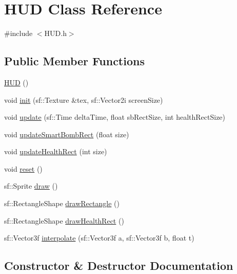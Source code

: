 \hypertarget{class_h_u_d}{}\section{H\+UD Class Reference}
\label{class_h_u_d}


{\ttfamily \#include $<$H\+U\+D.\+h$>$}

\subsection*{Public Member Functions}
\begin{DoxyCompactItemize}
\item 
\hyperlink{class_h_u_d_a568b8ee1591f9ba3ed36ae05966f6b56}{H\+UD} ()
\item 
void \hyperlink{class_h_u_d_abcd24489d983e367e38f1ee35e4f0cef}{init} (sf\+::\+Texture \&tex, sf\+::\+Vector2i screen\+Size)
\item 
void \hyperlink{class_h_u_d_a82e0269135f98973429dc257bb1c7d5a}{update} (sf\+::\+Time delta\+Time, float sb\+Rect\+Size, int health\+Rect\+Size)
\item 
void \hyperlink{class_h_u_d_a44b111c7f1f1c246203bd87f4ebff786}{update\+Smart\+Bomb\+Rect} (float size)
\item 
void \hyperlink{class_h_u_d_a6112a6edad58595a45c8f63f354615ee}{update\+Health\+Rect} (int size)
\item 
void \hyperlink{class_h_u_d_a9800d7a76e53e33264f444fd5c863bff}{reset} ()
\item 
sf\+::\+Sprite \hyperlink{class_h_u_d_a56cec922eca7a584bdc3799fbeaaf990}{draw} ()
\item 
sf\+::\+Rectangle\+Shape \hyperlink{class_h_u_d_acdbc5c7a94d57dd938a3d5b8514f1d78}{draw\+Rectangle} ()
\item 
sf\+::\+Rectangle\+Shape \hyperlink{class_h_u_d_aa87cf43eb5aa5c6e0c050f7d46064fbc}{draw\+Health\+Rect} ()
\item 
sf\+::\+Vector3f \hyperlink{class_h_u_d_aeb9ac3973c124a7e893d6c3cc9c8688f}{interpolate} (sf\+::\+Vector3f a, sf\+::\+Vector3f b, float t)
\end{DoxyCompactItemize}


\subsection{Constructor \& Destructor Documentation}
\mbox{\label{class_h_u_d_a568b8ee1591f9ba3ed36ae05966f6b56}} 
